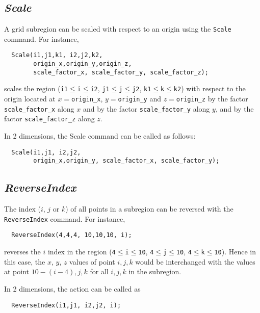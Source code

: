 \documentclass{warpdoc}
\begin{document}
\subsection{\emph{Scale}}

A grid subregion can be scaled with respect to
an origin using the \verb|Scale| command. For instance,
%
\begin{verbatim}
  Scale(i1,j1,k1, i2,j2,k2,
        origin_x,origin_y,origin_z,
        scale_factor_x, scale_factor_y, scale_factor_z);
\end{verbatim}
%
 scales the region
(\verb|i1|$\leq$\verb|i|$\leq$\verb|i2|,
  \verb|j1|$\leq$\verb|j|$\leq$\verb|j2|,
  \verb|k1|$\leq$\verb|k|$\leq$\verb|k2|)
with respect to the origin located at $x=$\verb|origin_x|,
$y=$\verb|origin_y| and $z=$\verb|origin_z| by the factor
\verb|scale_factor_x| along $x$ and by the factor
\verb|scale_factor_y| along $y$, and by the factor
\verb|scale_factor_z| along $z$.

In 2 dimensions, the Scale command can be called as follows:
%
\begin{verbatim}
  Scale(i1,j1, i2,j2,
        origin_x,origin_y, scale_factor_x, scale_factor_y);
\end{verbatim}
%



\subsection{\emph{ReverseIndex}}

The index ($i$, $j$ or $k$) of all points in a subregion
can be reversed with the
\verb|ReverseIndex| command. For instance,
%
\begin{verbatim}
  ReverseIndex(4,4,4, 10,10,10, i);
\end{verbatim}
%
 reverses the $i$ index in the region
(\verb|4|$\leq$\verb|i|$\leq$\verb|10|,
  \verb|4|$\leq$\verb|j|$\leq$\verb|10|,
  \verb|4|$\leq$\verb|k|$\leq$\verb|10|).
Hence in this case, the $x$, $y$, $z$ values of
point $i,j,k$ would be interchanged with the values
at point $10-(i-4),j,k$ for all $i,j,k$ in the subregion.

In 2 dimensions, the action can be called as
%
\begin{verbatim}
  ReverseIndex(i1,j1, i2,j2, i);
\end{verbatim}
%
\end{document}
